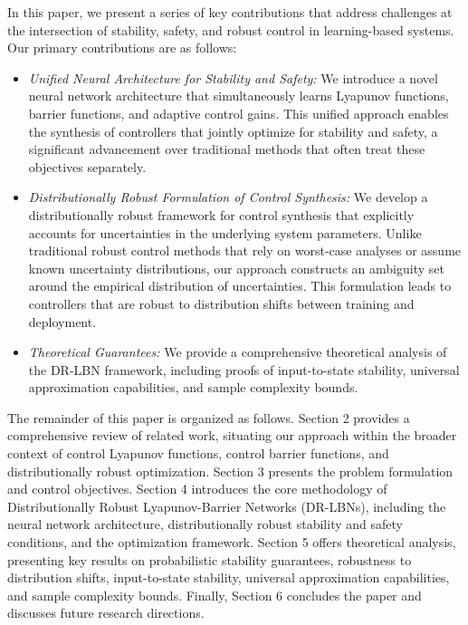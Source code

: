 \documentclass[11pt, oneside]{article}
\begin{document}
 In this paper, we present a series of key contributions that address challenges at the intersection of stability, safety, and robust control in learning-based systems. Our primary contributions are as follows:

\begin{itemize}

 \item \textit{Unified Neural Architecture for Stability and Safety:} We introduce a novel neural network architecture that simultaneously learns Lyapunov functions, barrier functions, and adaptive control gains. This unified approach enables the synthesis of controllers that jointly optimize for stability and safety, a significant advancement over traditional methods that often treat these objectives separately. 

 \item \textit{Distributionally Robust Formulation of Control Synthesis:} We develop a distributionally robust framework for control synthesis that explicitly accounts for uncertainties in the underlying system parameters. Unlike traditional robust control methods that rely on worst-case analyses or assume known uncertainty distributions, our approach constructs an ambiguity set around the empirical distribution of uncertainties. This formulation leads to controllers that are robust to distribution shifts between training and deployment.

 \item \textit{Theoretical Guarantees:} We provide a comprehensive theoretical analysis of the DR-LBN framework, including proofs of input-to-state stability, universal approximation capabilities, and sample complexity bounds.
 

\end{itemize}

 The remainder of this paper is organized as follows. Section 2 provides a comprehensive review of related work, situating our approach within the broader context of control Lyapunov functions, control barrier functions, and distributionally robust optimization. Section 3 presents the problem formulation and control objectives. Section 4 introduces the core methodology of Distributionally Robust Lyapunov-Barrier Networks (DR-LBNs), including the neural network architecture, distributionally robust stability and safety conditions, and the optimization framework. Section 5 offers theoretical analysis, presenting key results on probabilistic stability guarantees, robustness to distribution shifts, input-to-state stability, universal approximation capabilities, and sample complexity bounds. Finally, Section 6 concludes the paper and discusses future research directions.
\end{document}
